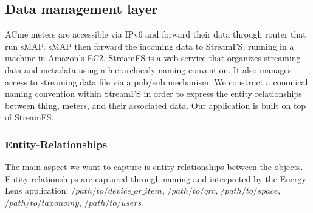 


\subsection{Data management layer}
ACme meters are accessible via IPv6 and forward their data through router that run sMAP.  sMAP then forward the incoming data
to StreamFS, running in a machine in Amazon's EC2.  StreamFS is a web service that organizes streaming data and metadata using
a hierarchicaly naming convention.  It also manages access to streaming data file via a pub/sub mechanism.  We construct 
a cononical naming convention within StreamFS in order to express the entity relationships between thing, meters, and their 
associated data.  Our application is built on top of StreamFS.

\subsubsection{Entity-Relationships}
The main aspect we want to capture is entity-relationships between the objects.  Entity relationships are captured through naming and 
interpreted by the Energy Lens application: $/path/to/device\_or\_item$, $/path/to/qrc$, $/path/to/space$, $/path/to/taxonomy$, 
$/path/to/users$.


